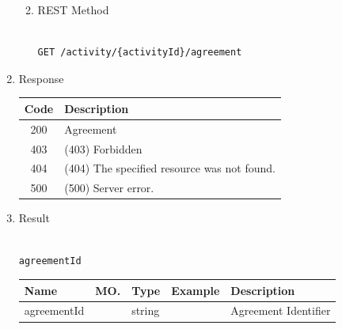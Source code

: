 \begin{enumerate}
\begin{enumerate}
\begin{table}[H]
\begin{center}
\begin{tabular}{|p{3cm}|l|p{3cm}|p{3cm}|p{4cm}|}
\end{tabular}
\end{center}
\end{table}


\item REST Method

\begin{tcolorbox}[boxrule=0pt, frame empty]
\begin{verbatim} 

GET /activity/{activityId}/agreement

\end{verbatim}
\end{tcolorbox}

\end{enumerate}

\item Response

\begin{table}[H]
\footnotesize

\begin{center}
\begin{tabular}{|c|l|} 
\hline
\rowcolor{lightgray}	Code 		& 	Description \\
\hline
200	 		&	Agreement \\
\hline
403			&	(403) Forbidden	\\
\hline
404			&	(404) The specified resource was not found. \\
\hline
500			&	(500) Server error. \\
\hline
\end{tabular}
\end{center}
\end{table}

\item Result

\begin{tcolorbox}[boxrule=0pt, frame empty]
\begin{verbatim}

agreementId

\end{verbatim}
\end{tcolorbox}

\begin{table}[H]
\footnotesize
\begin{center}
\begin{tabular}{|p{3cm}|l|p{3cm}|p{3cm}|p{4cm}|} 
\hline
\rowcolor{lightgray}	Name	& MO.	& Type	& Example & 	Description \\
\hline
agreementId				&	&	string		&	&	Agreement Identifier \\
\hline   
\end{tabular}
\end{center}
\end{table}


\end{enumerate}

